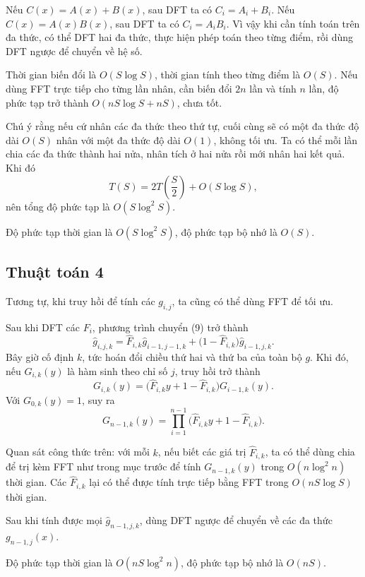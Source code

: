 \documentclass[11pt]{article}
\begin{document}
Nếu \(C(x)=A(x)+B(x)\), sau DFT ta có \(C_i=A_i+B_i\). Nếu
\(C(x)=A(x)B(x)\), sau DFT ta có \(C_i=A_iB_i\). Vì vậy khi cần tính toán trên
đa thức, có thể DFT hai đa thức, thực hiện phép toán theo từng điểm, rồi dùng
DFT ngược để chuyển về hệ số.

Thời gian biến đổi là \(O(S\log S)\), thời gian tính theo từng điểm là \(O(S)\).
Nếu dùng FFT trực tiếp cho từng lần nhân, cần biến đổi \(2n\) lần và tính \(n\)
lần, độ phức tạp trở thành \(O(nS\log S+nS)\), chưa tốt.

Chú ý rằng nếu cứ nhân các đa thức theo thứ tự, cuối cùng sẽ có một đa thức độ
dài \(O(S)\) nhân với một đa thức độ dài \(O(1)\), không tối ưu. Ta có thể mỗi
lần chia các đa thức thành hai nửa, nhân tích ở hai nửa rồi mới nhân hai kết
quả. Khi đó
\[
  T(S)=2T\left(\frac S2\right)+O(S\log S), \tag{12}
\]
nên tổng độ phức tạp là \(O(S\log^2 S)\).

Độ phức tạp thời gian là \(O(S\log^2 S)\), độ phức tạp bộ nhớ là \(O(S)\).

\subsection{Thuật toán 4}

Tương tự, khi truy hồi để tính các \(g_{i,j}\), ta cũng có thể dùng FFT để tối
ưu.

Sau khi DFT các \(F_i\), phương trình chuyển (9) trở thành
\[
  \widehat g_{i,j,k}
  =\widehat F_{i,k}\widehat g_{i-1,j-1,k}
  +\bigl(1-\widehat F_{i,k}\bigr)\widehat g_{i-1,j,k}. \tag{13}
\]
Bây giờ cố định \(k\), tức hoán đổi chiều thứ hai và thứ ba của toàn bộ \(g\).
Khi đó, nếu \(G_{i,k}(y)\) là hàm sinh theo chỉ số \(j\), truy hồi trở thành
\[
  G_{i,k}(y)=
  \bigl(\widehat F_{i,k}y+1-\widehat F_{i,k}\bigr)G_{i-1,k}(y). \tag{14}
\]
Với \(G_{0,k}(y)=1\), suy ra
\[
  G_{n-1,k}(y)=
  \prod_{i=1}^{n-1}\bigl(\widehat F_{i,k}y+1-\widehat F_{i,k}\bigr). \tag{15}
\]

Quan sát công thức trên: với mỗi \(k\), nếu biết các giá trị
\(\widehat F_{i,k}\), ta có thể dùng chia để trị kèm FFT như trong mục trước để
tính \(G_{n-1,k}(y)\) trong \(O(n\log^2 n)\) thời gian. Các
\(\widehat F_{i,k}\) lại có thể được tính trực tiếp bằng FFT trong
\(O(nS\log S)\) thời gian.

Sau khi tính được mọi \(\widehat g_{n-1,j,k}\), dùng DFT ngược để chuyển về các
đa thức \(g_{n-1,j}(x)\).

Độ phức tạp thời gian là \(O(nS\log^2 n)\), độ phức tạp bộ nhớ là \(O(nS)\).
\end{document}
